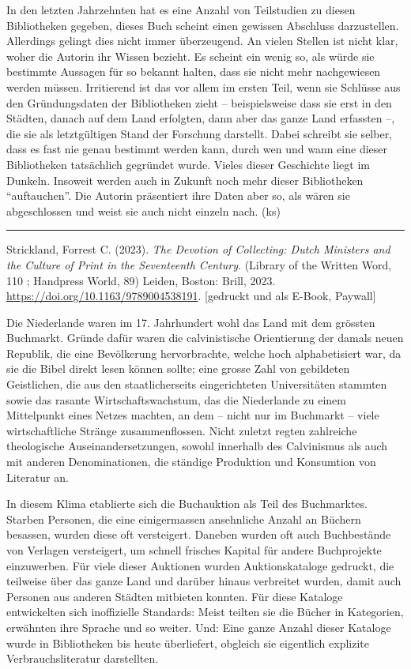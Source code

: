 \documentclass[a4paper,
fontsize=11pt,
oneside,
numbers=noperiodatend,
parskip=half-,
bibliography=totoc,
final
]{scrartcl}
\begin{document}
In den letzten Jahrzehnten hat es eine Anzahl von Teilstudien zu diesen
Bibliotheken gegeben, dieses Buch scheint einen gewissen Abschluss
darzustellen. Allerdings gelingt dies nicht immer überzeugend. An vielen
Stellen ist nicht klar, woher die Autorin ihr Wissen bezieht. Es scheint
ein wenig so, als würde sie bestimmte Aussagen für so bekannt halten,
dass sie nicht mehr nachgewiesen werden müssen. Irritierend ist das vor
allem im ersten Teil, wenn sie Schlüsse aus den Gründungsdaten der
Bibliotheken zieht -- beispielsweise dass sie erst in den Städten,
danach auf dem Land erfolgten, dann aber das ganze Land erfassten --,
die sie als letztgültigen Stand der Forschung darstellt. Dabei schreibt
sie selber, dass es fast nie genau bestimmt werden kann, durch wen und
wann eine dieser Bibliotheken tatsächlich gegründet wurde. Vieles dieser
Geschichte liegt im Dunkeln. Insoweit werden auch in Zukunft noch mehr
dieser Bibliotheken \enquote{auftauchen}. Die Autorin präsentiert ihre
Daten aber so, als wären sie abgeschlossen und weist sie auch nicht
einzeln nach. (ks)

\begin{center}\rule{0.5\linewidth}{0.5pt}\end{center}

Strickland, Forrest C. (2023). \emph{The Devotion of Collecting: Dutch
Ministers and the Culture of Print in the Seventeenth Century}. (Library
of the Written Word, 110 ; Handpress World, 89) Leiden, Boston: Brill,
2023. \url{https://doi.org/10.1163/9789004538191}. {[}gedruckt und als
E-Book, Paywall{]}

Die Niederlande waren im 17. Jahrhundert wohl das Land mit dem grössten
Buchmarkt. Gründe dafür waren die calvinistische Orientierung der damals
neuen Republik, die eine Bevölkerung hervorbrachte, welche hoch
alphabetisiert war, da sie die Bibel direkt lesen können sollte; eine
grosse Zahl von gebildeten Geistlichen, die aus den staatlicherseits
eingerichteten Universitäten stammten sowie das rasante
Wirtschaftswachstum, das die Niederlande zu einem Mittelpunkt eines
Netzes machten, an dem -- nicht nur im Buchmarkt -- viele
wirtschaftliche Stränge zusammenflossen. Nicht zuletzt regten zahlreiche
theologische Auseinandersetzungen, sowohl innerhalb des Calvinismus als
auch mit anderen Denominationen, die ständige Produktion und Konsumtion
von Literatur an.

In diesem Klima etablierte sich die Buchauktion als Teil des
Buchmarktes. Starben Personen, die eine einigermassen ansehnliche Anzahl
an Büchern besassen, wurden diese oft versteigert. Daneben wurden oft
auch Buchbestände von Verlagen versteigert, um schnell frisches Kapital
für andere Buchprojekte einzuwerben. Für viele dieser Auktionen wurden
Auktionskataloge gedruckt, die teilweise über das ganze Land und darüber
hinaus verbreitet wurden, damit auch Personen aus anderen Städten
mitbieten konnten. Für diese Kataloge entwickelten sich inoffizielle
Standards: Meist teilten sie die Bücher in Kategorien, erwähnten ihre
Sprache und so weiter. Und: Eine ganze Anzahl dieser Kataloge wurde in
Bibliotheken bis heute überliefert, obgleich sie eigentlich explizite
Verbrauchsliteratur darstellten.
\end{document}
